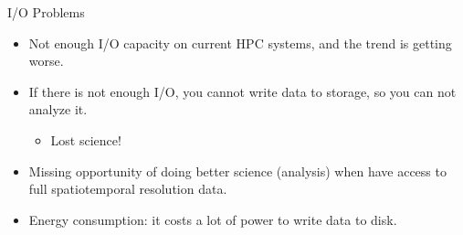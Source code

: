\documentclass[compress,11pt,xcolor=svgnames,aspectratio=169]{beamer}
\begin{document}
\begin{frame}[fragile]{I/O Problems}

\begin{itemize}
\setlength\itemsep{0.7cm}

\item Not enough I/O capacity on current HPC systems, and the trend is getting worse.

\item If there is not enough I/O, you cannot write data to storage, so you can not analyze it.
    \begin{itemize}
        \item Lost science!
    \end{itemize}

\item Missing opportunity of doing better science (analysis) when have access to full spatiotemporal resolution data.

\item Energy consumption: it costs a lot of power to write data to disk.

\end{itemize}

\nocite{sensei-sc17}

\end{frame}
\end{document}
